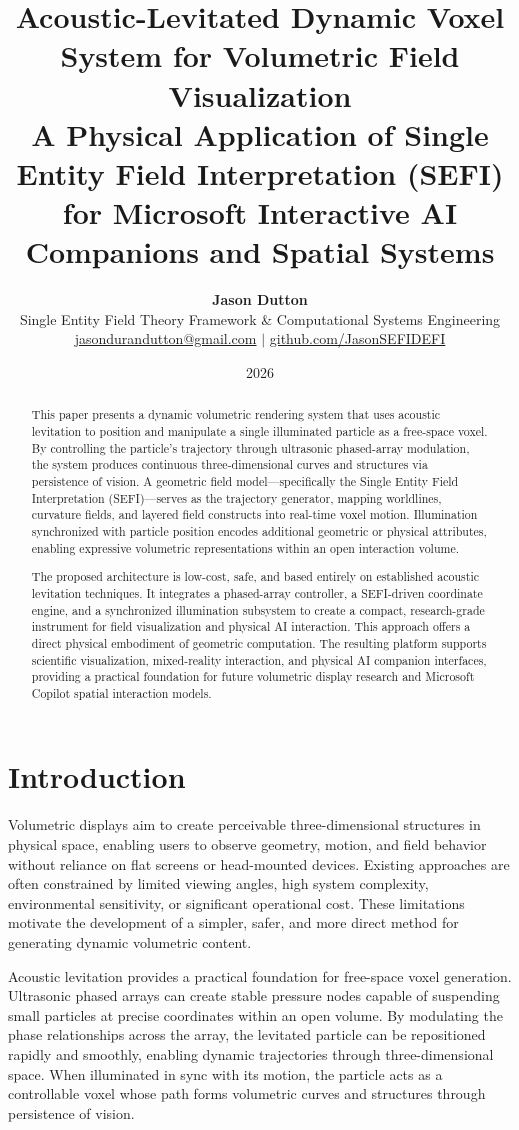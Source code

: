\documentclass[10pt,twocolumn]{article}
\title{\textbf{Acoustic-Levitated Dynamic Voxel System for Volumetric Field Visualization}\\
\large A Physical Application of Single Entity Field Interpretation (SEFI) for Microsoft Interactive AI Companions and Spatial Systems}
\author{\textbf{Jason Dutton}\\
\small Single Entity Field Theory Framework \& Computational Systems Engineering\\
\small \href{mailto:jasondurandutton@gmail.com}{jasondurandutton@gmail.com} $|$ \href{https://github.com/JasonSEFIDEFI}{github.com/JasonSEFIDEFI}}
\date{2026}
\begin{document}
\maketitle

\begin{abstract}
This paper presents a dynamic volumetric rendering system that uses acoustic levitation to position and manipulate a single illuminated particle as a free-space voxel. By controlling the particle's trajectory through ultrasonic phased-array modulation, the system produces continuous three-dimensional curves and structures via persistence of vision. A geometric field model—specifically the Single Entity Field Interpretation (SEFI)—serves as the trajectory generator, mapping worldlines, curvature fields, and layered field constructs into real-time voxel motion. Illumination synchronized with particle position encodes additional geometric or physical attributes, enabling expressive volumetric representations within an open interaction volume.

The proposed architecture is low-cost, safe, and based entirely on established acoustic levitation techniques. It integrates a phased-array controller, a SEFI-driven coordinate engine, and a synchronized illumination subsystem to create a compact, research-grade instrument for field visualization and physical AI interaction. This approach offers a direct physical embodiment of geometric computation. The resulting platform supports scientific visualization, mixed-reality interaction, and physical AI companion interfaces, providing a practical foundation for future volumetric display research and Microsoft Copilot spatial interaction models.
\end{abstract}
\section{Introduction}
Volumetric displays aim to create perceivable three-dimensional structures in physical space, enabling users to observe geometry, motion, and field behavior without reliance on flat screens or head-mounted devices. Existing approaches are often constrained by limited viewing angles, high system complexity, environmental sensitivity, or significant operational cost. These limitations motivate the development of a simpler, safer, and more direct method for generating dynamic volumetric content.

Acoustic levitation provides a practical foundation for free-space voxel generation. Ultrasonic phased arrays can create stable pressure nodes capable of suspending small particles at precise coordinates within an open volume. By modulating the phase relationships across the array, the levitated particle can be repositioned rapidly and smoothly, enabling dynamic trajectories through three-dimensional space. When illuminated in sync with its motion, the particle acts as a controllable voxel whose path forms volumetric curves and structures through persistence of vision.
\end{document}

